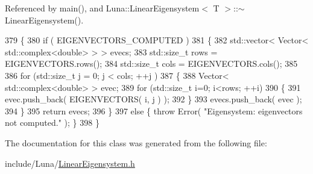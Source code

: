 Referenced by main(), and Luna\+::\+Linear\+Eigensystem$<$ T $>$\+::$\sim$\+Linear\+Eigensystem().


\begin{DoxyCode}
379   \{
380     \textcolor{keywordflow}{if} ( EIGENVECTORS\_COMPUTED )
381     \{
382       std::vector< Vector< std::complex<double> > > evecs;
383       std::size\_t rows = EIGENVECTORS.rows();
384       std::size\_t cols = EIGENVECTORS.cols();
385 
386       \textcolor{keywordflow}{for} (std::size\_t j = 0; j < cols; ++j )
387       \{
388           Vector< std::complex<double> > evec;
389           \textcolor{keywordflow}{for} (std::size\_t i=0; i<rows; ++i)
390           \{
391               evec.push\_back( EIGENVECTORS( i, j ) );
392           \}
393           evecs.push\_back( evec );
394       \}
395       \textcolor{keywordflow}{return} evecs;
396     \}
397     \textcolor{keywordflow}{else} \{ \textcolor{keywordflow}{throw} Error( \textcolor{stringliteral}{"Eigensystem: eigenvectors not computed."} ); \}
398   \}
\end{DoxyCode}


The documentation for this class was generated from the following file\+:\begin{DoxyCompactItemize}
\item 
include/\+Luna/\hyperlink{LinearEigensystem_8h}{Linear\+Eigensystem.\+h}\end{DoxyCompactItemize}
